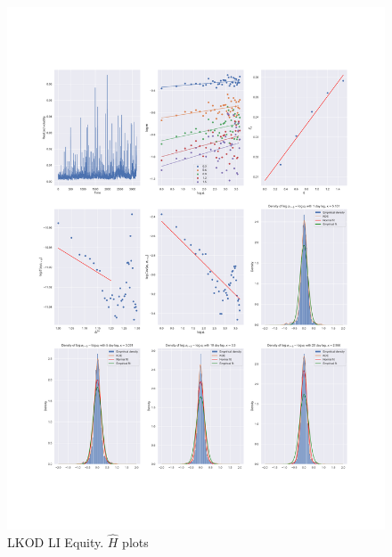 \begin{figure}[h]
    \centering
    \includegraphics[width=\linewidth]{fig/LKOD LI Equity.pdf}
    \caption{LKOD LI Equity. $\hat{H}$ plots}
\end{figure} 

